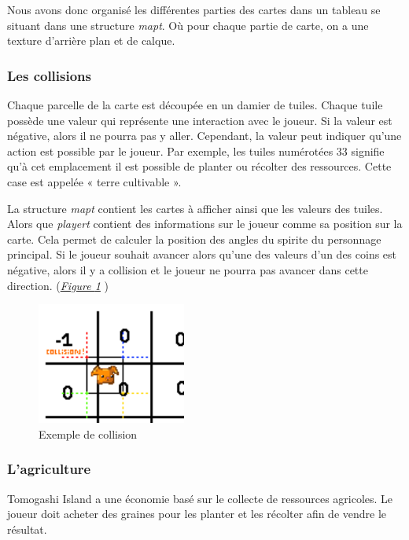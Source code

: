 \documentclass{article}
\begin{document}
        Nous avons donc organisé les différentes parties des cartes dans un tableau se situant dans une structure \textit{map\textunderscore t}. Où pour chaque partie de carte, on a une texture d'arrière plan et de calque.
        
        \subsubsection{Les collisions}
        Chaque parcelle de la carte est découpée en un damier de tuiles. Chaque tuile possède une valeur qui représente une interaction avec le joueur. Si la valeur est négative, alors il ne pourra pas y aller. Cependant, la valeur peut indiquer qu'une action est possible par le joueur. Par exemple, les tuiles numérotées 33 signifie qu'à cet emplacement il est possible de planter ou récolter des ressources. Cette case est appelée « terre cultivable ».

        La structure \textit{map\textunderscore t} contient les cartes à afficher ainsi que les valeurs des tuiles. Alors que \textit{player\textunderscore t} contient des informations sur le joueur comme sa position sur la carte. Cela permet de calculer la position des angles du spirite du personnage principal. Si le joueur souhait avancer alors qu'une des valeurs d'un des coins est négative, alors il y a collision et le joueur ne pourra pas avancer dans cette direction. (\textit{\hyperref[fig:collions]{Figure \ref{fig:collions}}} )

        \begin{figure}[!h]  
            \includegraphics[height = 4cm]{exermple_collision.png}
            \centering
            \caption{Exemple de collision}
            \label{fig:collions}
        \end{figure}
        
        \subsubsection{L'agriculture}
        Tomogashi Island a une économie basé sur le collecte de ressources agricoles. Le joueur doit acheter des graines pour les planter et les récolter afin de vendre le résultat.
\end{document}
